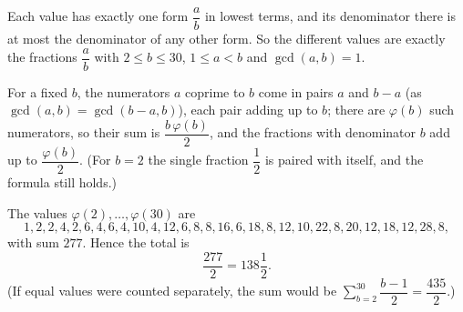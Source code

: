 Each value has exactly one form $\dfrac ab$ in lowest terms, and its denominator there is at most the denominator of any other form. So the different values are exactly the fractions $\dfrac ab$ with $2\le b\le30$, $1\le a<b$ and $\gcd(a,b)=1$.

For a fixed $b$, the numerators $a$ coprime to $b$ come in pairs $a$ and $b-a$ (as $\gcd(a,b)=\gcd(b-a,b)$), each pair adding up to $b$; there are $\varphi(b)$ such numerators, so their sum is $\dfrac{b\,\varphi(b)}{2}$, and the fractions with denominator $b$ add up to $\dfrac{\varphi(b)}{2}$. (For $b=2$ the single fraction $\dfrac12$ is paired with itself, and the formula still holds.)

The values $\varphi(2),\dots,\varphi(30)$ are
\[1,2,2,4,2,6,4,6,4,10,4,12,6,8,8,16,6,18,8,12,10,22,8,20,12,18,12,28,8,\]
with sum $277$. Hence the total is
\[\dfrac{277}{2}=\boxed{138\dfrac12}.\]
(If equal values were counted separately, the sum would be $\displaystyle\sum_{b=2}^{30}\dfrac{b-1}{2}=\dfrac{435}{2}$.)
